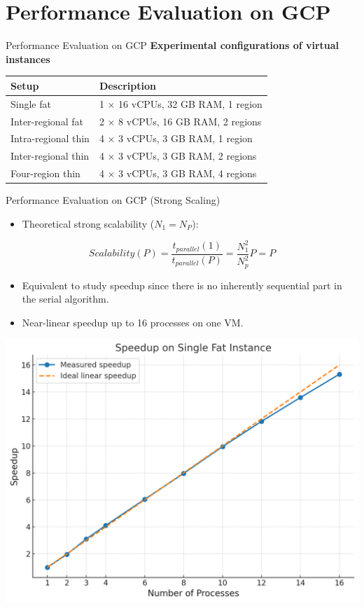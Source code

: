\documentclass{beamer}
\begin{document}
\section{Performance Evaluation on GCP}
\begin{frame}{Performance Evaluation on GCP}
\centering
\textbf{Experimental configurations of virtual instances}
\vspace{0.4cm}

\begin{tabular}{l l}
\toprule
\textbf{Setup} & \textbf{Description} \\
\midrule
Single fat & 1 × 16 vCPUs, 32 GB RAM, 1 region \\
Inter-regional fat & 2 × 8 vCPUs, 16 GB RAM, 2 regions \\
Intra-regional thin & 4 × 3 vCPUs, 3 GB RAM, 1 region \\
Inter-regional thin & 4 × 3 vCPUs, 3 GB RAM, 2 regions \\
Four-region thin & 4 × 3 vCPUs, 3 GB RAM, 4 regions \\
\bottomrule
\end{tabular}
\end{frame}


\begin{frame}{Performance Evaluation on GCP (Strong Scaling)}
\begin{itemize}
\item Theoretical strong scalability ($N_1=N_P$):
\end{itemize}
\[
Scalability(P) = \frac{t_{parallel}(1)}{t_{parallel}(P)} = \frac{N_1^2}{N_p^2}P = P
\]
\begin{itemize}
	\item Equivalent to study speedup since there is no inherently sequential part in the serial algorithm.
	\item Near-linear speedup up to 16 processes on one VM.
\end{itemize}
\vspace{0.5em}
\centering
\includegraphics[width=0.5\linewidth]{parallel_strong_scaling_16_cores.png}
\end{frame}
\end{document}
